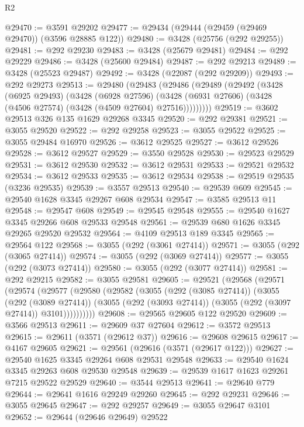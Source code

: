\begin{lexlean}{R2}
\begin{coremodule}
@29470 := @3591 @29202
@29477 := @29434 (@29444 (@29459 (@29469 @29470)) (@3596 @28885 @122))
@29480 := @3428 (@25756 (@292 @29255))
@29481 := @292 @29230
@29483 := @3428 (@25679 @29481)
@29484 := @292 @29229
@29486 := @3428 (@25600 @29484)
@29487 := @292 @29213
@29489 := @3428 (@25523 @29487)
@29492 := @3428 (@22087 (@292 @29209))
@29493 := @292 @29273
@29513 := @29480
    (@29483
      (@29486
        (@29489
          (@29492
            (@3428
              (@6925 @29493)
              (@3428
                (@6928 @27596)
                (@3428 (@6931 @27606) (@3428 (@4506 @27574) (@3428 (@4509 @27604) @27516)))))))))
@29519 := @3602 @29513 @326 @135 @1629 @29268 @3345
@29520 := @292 @29381
@29521 := @3055 @29520
@29522 := @292 @29258
@29523 := @3055 @29522
@29525 := @3055 @29484 @16970
@29526 := @3612 @29525
@29527 := @3612 @29526
@29528 := @3612 @29527
@29529 := @3550 @29528
@29530 := @29523 @29529
@29531 := @3612 @29530
@29532 := @3612 @29531
@29533 := @29521 @29532
@29534 := @3612 @29533
@29535 := @3612 @29534
@29538 := @29519 @29535 (@3236 @29535)
@29539 := @3557 @29513
@29540 := @29539 @609
@29545 := @29540 @1628 @3345 @29267 @608 @29534
@29547 := @3585 @29513 @11
@29548 := @29547 @608
@29549 := @29545 @29548
@29555 := @29540 @1627 @3345 @29266 @608 @29533 @29548
@29561 := @29539 @680 @1626 @3345 @29265 @29520 @29532
@29564 := @4109 @29513 @189 @3345
@29565 := @29564 @122
@29568 := @3055 (@292 (@3061 @27414))
@29571 := @3055 (@292 (@3065 @27414))
@29574 := @3055 (@292 (@3069 @27414))
@29577 := @3055 (@292 (@3073 @27414))
@29580 := @3055 (@292 (@3077 @27414))
@29581 := @292 @29215
@29582 := @3055 @29581
@29605 := @29521
    (@29568
      (@29571
        (@29574
          (@29577
            (@29580
              (@29582
                (@3055
                  (@292 (@3085 @27414))
                  (@3055
                    (@292 (@3089 @27414))
                    (@3055 (@292 (@3093 @27414)) (@3055 (@292 (@3097 @27414)) @3101))))))))))
@29608 := @29565 @29605 @122 @29520
@29609 := @3566 @29513
@29611 := @29609 @37 @27604
@29612 := @3572 @29513
@29615 := @29611 (@3571 (@29612 @37))
@29616 := @29608 @29615
@29617 := @4167 @29605
@29621 := @29561 (@29616 (@3571 (@29617 @122)))
@29627 := @29540 @1625 @3345 @29264 @608 @29531 @29548
@29633 := @29540 @1624 @3345 @29263 @608 @29530 @29548
@29639 := @29539 @1617 @1623 @29261 @7215 @29522 @29529
@29640 := @3544 @29513
@29641 := @29640 @779
@29644 := @29641 @1616 @29249 @29260
@29645 := @292 @29231
@29646 := @3055 @29645
@29647 := @292 @29257
@29649 := @3055 @29647 @3101
@29652 := @29644 (@29646 @29649) @29522

\end{coremodule}
\end{lexlean}
